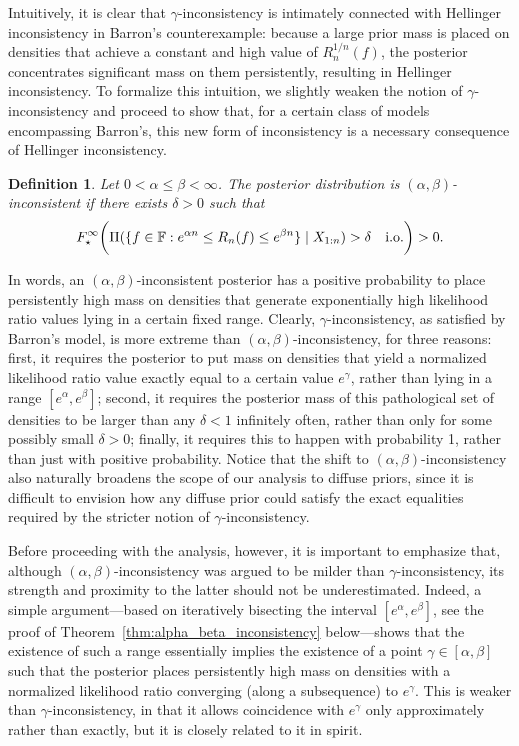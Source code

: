 \documentclass[11pt,twoside]{article}
\newtheorem{definition}{Definition}
\def\FF{\mathbb{F}}
\def\FF{\mathbb{F}}
\begin{document}
Intuitively, it is clear that $\gamma$-inconsistency is intimately connected with Hellinger inconsistency in Barron's counterexample: because a large prior mass is placed on densities that achieve a constant and high value of $R_n^{1/n}(f)$, the posterior concentrates significant mass on them persistently, resulting in Hellinger inconsistency. To formalize this intuition, we slightly weaken the notion of $\gamma$-inconsistency and proceed to show that, for a certain class of models encompassing Barron's, this new form of inconsistency is a necessary consequence of Hellinger inconsistency.

\begin{definition}\label{def:alpha_beta_inconsistency}
    Let $0<\alpha\leq \beta<\infty$. The posterior distribution is \emph{$(\alpha,\beta)$-inconsistent} if there exists $\delta>0$ such that
    \begin{equation*}
        F_\star^\infty\bigg(\Pi(\{f\in\FF : e^{\alpha n}\leq R_n(f)\leq e^{\beta n}\}\mid X_{1:n})>\delta \quad \textnormal{i.o.}\bigg) > 0.
    \end{equation*}
\end{definition}
%
In words, an $(\alpha,\beta)$-inconsistent posterior has a positive probability to place persistently high mass on densities that generate exponentially high likelihood ratio values lying in a certain fixed range. Clearly, $\gamma$-inconsistency, as satisfied by Barron's model, is more extreme than $(\alpha, \beta)$-inconsistency, for three reasons: first, it requires the posterior to put mass on densities that yield a normalized likelihood ratio value exactly equal to a certain value $e^\gamma$, rather than lying in a range $[e^\alpha,e^\beta]$; second, it requires the posterior mass of this pathological set of densities to be larger than any $\delta<1$ infinitely often, rather than only for some possibly small $\delta>0$; finally, it requires this to happen with probability 1, rather than just with positive probability. Notice that the shift to $(\alpha,\beta)$-inconsistency also naturally broadens the scope of our analysis to diffuse priors, since it is difficult to envision how any diffuse prior could satisfy the exact equalities required by the stricter notion of $\gamma$-inconsistency.

Before proceeding with the analysis, however, it is important to emphasize that, although $(\alpha,\beta)$-inconsistency was argued to be milder than $\gamma$-inconsistency, its strength and proximity to the latter should not be underestimated. Indeed, a simple argument—based on iteratively bisecting the interval $[e^\alpha,e^\beta]$, see the proof of Theorem~\ref{thm:alpha_beta_inconsistency} below—shows that the existence of such a range essentially implies the existence of a point $\gamma \in [\alpha,\beta]$ such that the posterior places persistently high mass on densities with a normalized likelihood ratio converging (along a subsequence) to $e^\gamma$. This is weaker than $\gamma$-inconsistency, in that it allows coincidence with $e^\gamma$ only approximately rather than exactly, but it is closely related to it in spirit.
\end{document}

